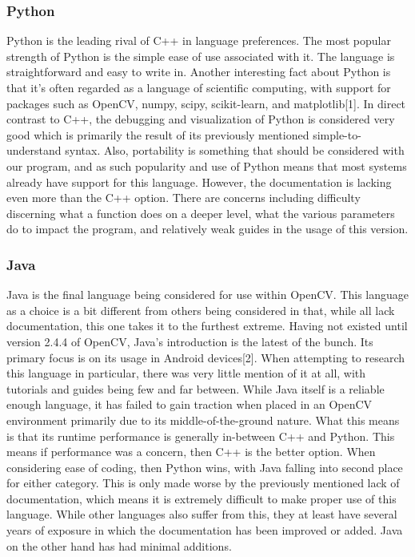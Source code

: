 \documentclass[onecolumn, draftclsnofoot,10pt, compsoc]{IEEEtran}
\begin{document}
\subsubsection{Python}
Python is the leading rival of C++ in language preferences. The most popular strength of Python is the simple ease of use associated with it. The language is straightforward and easy to write in. Another interesting fact about Python is that it’s often regarded as a language of scientific computing, with support for packages such as OpenCV, numpy, scipy, scikit-learn, and matplotlib[1]. In direct contrast to C++, the debugging and visualization of Python is considered very good which is primarily the result of its previously mentioned simple-to-understand syntax. Also, portability is something that should be considered with our program, and as such popularity and use of Python means that most systems already have support for this language. However, the documentation is lacking even more than the C++ option. There are concerns including difficulty discerning what a function does on a deeper level, what the various parameters do to impact the program, and relatively weak guides in the usage of this version.

\subsubsection{Java}
Java is the final language being considered for use within OpenCV. This language as a choice is a bit different from others being considered in that, while all lack documentation, this one takes it to the furthest extreme. Having not existed until version 2.4.4 of OpenCV, Java’s introduction is the latest of the bunch. Its primary focus is on its usage in Android devices[2]. When attempting to research this language in particular, there was very little mention of it at all, with tutorials and guides being few and far between. While Java itself is a reliable enough language, it has failed to gain traction when placed in an OpenCV environment primarily due to its middle-of-the-ground nature. What this means is that its runtime performance is generally in-between C++ and Python. This means if performance was a concern, then C++ is the better option. When considering ease of coding, then Python wins, with Java falling into second place for either category. This is only made worse by the previously mentioned lack of documentation, which means it is extremely difficult to make proper use of this language. While other languages also suffer from this, they at least have several years of exposure in which the documentation has been improved or added. Java on the other hand has had minimal additions.
\end{document}

